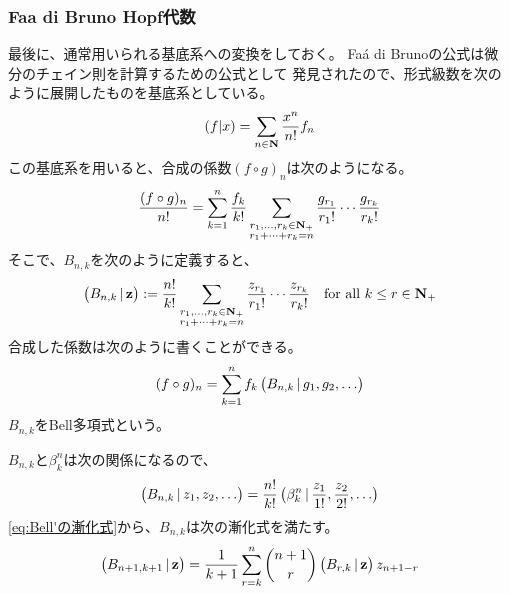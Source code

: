{\subsubsection{Faa di Bruno Hopf代数}\label{s3:Faa di Bruno Hopf代数} %
	最後に、通常用いられる基底系への変換をしておく。
	Fa\'a di Brunoの公式は微分のチェイン則を計算するための公式として
	発見されたので、形式級数を次のように展開したものを基底系としている。
	\begin{equation*}\begin{split}
		(f|x) = \sum_{n\in\mathbf{N}} \frac{x^n}{n!} f_n
	\end{split}\end{equation*}
	この基底系を用いると、合成の係数$(f\circ g)_n$は次のようになる。
	\begin{equation*}\begin{split}
		\frac{(f\circ g)_n}{n!} = \sum_{k=1}^n \frac{f_k}{k!}
		\sum_{\substack{r_1,\dots,r_k\in\mathbf{N}_+\\r_1+\cdots+r_k=n}} 
		\frac{g_{r_1}}{r_1!}\cdots\frac{g_{r_k}}{r_k!}
	\end{split}\end{equation*}
	そこで、$B_{n,k}$を次のように定義すると、
	\begin{equation*}\begin{split}
		\mathinner{\bigl({B_{n,k}\,\vert\,\mathbf{z}}\bigr)} := \frac{n!}{k!}
		\sum_{\substack{r_1,\dots,r_k\in\mathbf{N}_+\\r_1+\cdots+r_k=n}} 
		\frac{z_{r_1}}{r_1!}\cdots\frac{z_{r_k}}{r_k!}
		\quad\text{for all } k\le r\in\mathbf{N}_+
	\end{split}\end{equation*}
	合成した係数は次のように書くことができる。
	\begin{equation*}\begin{split}
		(f\circ g)_n = \sum_{k=1}^n f_k \mathinner{\bigl({B_{n,k}\,\vert\,g_1,g_2,\dots}\bigr)}
	\end{split}\end{equation*}
	$B_{n,k}$をBell多項式という。
	
	$B_{n,k}$と$\beta^n_k$は次の関係になるので、
	\begin{equation*}\begin{split}
		\mathinner{\bigl({B_{n,k}\,\vert\,z_1,z_2,\dots}\bigr)} = \frac{n!}{k!}
		\mathinner{\bigl({\beta^n_k\,\vert\,\frac{z_1}{1!},\frac{z_2}{2!},\dots}\bigr)}
	\end{split}\end{equation*}
	\eqref{eq:Bell'の漸化式}から、$B_{n,k}$は次の漸化式を満たす。
	\begin{equation*}\begin{split}
		\mathinner{\bigl({B_{n+1,k+1}\,\vert\,\mathbf{z}}\bigr)} = \frac{1}{k+1}\sum_{r=k}^n 
		\binom{n+1}{r} \mathinner{\bigl({B_{r,k}\,\vert\,\mathbf{z}}\bigr)}z_{n+1-r}
	\end{split}\end{equation*}

}
